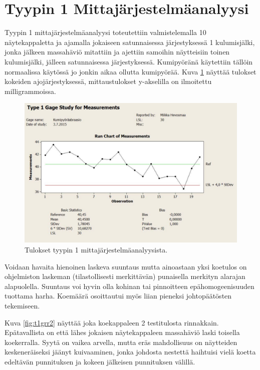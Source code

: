 \documentclass[12pt,a4paper,finnish]{tutthesis}
\begin{document}
\section{Tyypin 1 Mittajärjestelmäanalyysi}

Tyypin 1 mittajärjestelmäanalyysi toteutettiin valmistelemalla 10 näytekappaletta ja ajamalla jokaiseen satunnaisessa järjestyksessä 1 kulumisjälki, jonka jälkeen massahäviö mitattiin ja ajettiin samoihin näytteisiin toinen kulumisjälki, jälleen satunnaisessa järjestyksessä. Kumipyöränä käytettiin tällöin
normaalissa käytössä jo jonkin aikaa ollutta kumipyörää.
Kuva \ref{fig:t1grr} näyttää tulokset kokeiden ajojärjestyksessä, mittaustulokset y-akselilla on ilmoitettu milligrammoissa.

\begin{figure}
  \begin{center}
    \includegraphics[width=1.0\textwidth]{t1grr}
  \end{center}
  \caption[Tulokset tyypin 1 mittajärjestelmäanalyysista]{Tulokset tyypin 1 mittajärjestelmäanalyysista.}
  \label{fig:t1grr}
\end{figure}

Voidaan havaita hienoinen laskeva suuntaus mutta ainoastaan yksi koetulos on ohjelmiston laskeman (tilastollisesti merkittävän) punaisella merkityn alarajan alapuolella. Suuntaus voi hyvin olla kohinan tai pinnoitteen epähomogeenisuuden tuottama harha.
Koemäärä osoittautui myös liian pieneksi johtopäätösten tekemiseen.

Kuva \ref{fig:t1grr2} näyttää joka koekappaleen 2 testitulosta rinnakkain.
Epätavallista on että lähes jokaisen näytekappaleen massahäviö
laski toisella koekerralla. Syytä on vaikea arvella, mutta eräs
mahdollisuus on näytteiden keskeneräiseksi jäänyt kuivaaminen,
jonka johdosta nestettä haihtuisi vielä koetta edeltävän punnituksen
ja kokeen jälkeisen punnituksen välillä.
\end{document}
